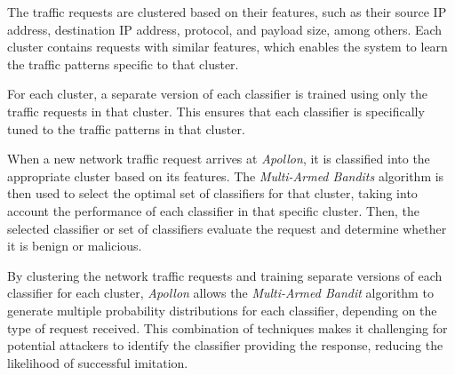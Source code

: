 The traffic requests are clustered based on their features, such as their source IP address, destination IP address,
protocol, and payload size, among others.
Each cluster contains requests with similar features, which enables the system to learn the traffic patterns specific
to that cluster.

For each cluster, a separate version of each classifier is trained using only the traffic requests in that cluster.
This ensures that each classifier is specifically tuned to the traffic patterns in that cluster.

When a new network traffic request arrives at \textit{Apollon}, it is classified into the appropriate cluster based on its
features.
The \textit{Multi-Armed Bandits} algorithm is then used to select the optimal set of classifiers for that cluster, taking into
account the performance of each classifier in that specific cluster.
Then, the selected classifier or set of classifiers evaluate the request and determine whether it is benign or malicious.

By clustering the network traffic requests and training separate versions of each classifier for each cluster, \textit{Apollon}
allows the \textit{Multi-Armed Bandit} algorithm to generate multiple probability distributions for each classifier, depending
on the type of request received.
This combination of techniques makes it challenging for potential attackers to identify the classifier providing the
response, reducing the likelihood of successful imitation.